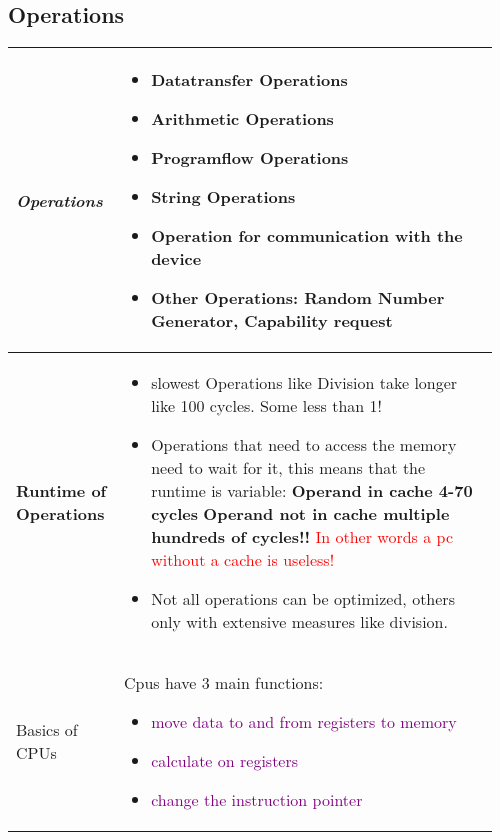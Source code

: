 \documentclass[main.tex,fontsize=8pt,paper=a4,paper=portrait,DIV=calc,]{scrartcl}
\begin{document}
\begin{table}[h!]
\subsection{Operations}
\begin{tabular}{|m{0.2\linewidth}|m{0.755\linewidth}|}
\hline
\emph{Operations} & 
\vspace{2mm}
\begin{itemize}
  \item \textbf{Datatransfer Operations}
  \item \textbf{Arithmetic Operations}
  \item \textbf{Programflow Operations}
  \item \textbf{String Operations}
  \item \textbf{Operation for communication with the device}
  \item \textbf{Other Operations: Random Number Generator, Capability request}
  \vspace{-3mm}
\end{itemize}\\
\hline
\textbf{Runtime of Operations} & 
\vspace{2mm}
\begin{itemize}
  \item slowest Operations like Division take longer like 100 cycles. Some less than 1!
  \item Operations that need to access the memory need to wait for it,\newline
  this means that the runtime is variable: \newline
  \textbf{Operand in cache 4-70 cycles}\newline
  \textbf{Operand not in cache multiple hundreds of cycles!!}\newline
  \textcolor{red}{In other words a pc without a cache is useless!}
\item Not all operations can be optimized, others only with extensive measures like division.
  \vspace{-3mm}
\end{itemize}\\
\hline
Basics of CPUs & 
Cpus have 3 main functions:\newline
\begin{itemize}
\item \textcolor{purple}{move data to and from registers to memory}
\item \textcolor{purple}{calculate on registers}
\item \textcolor{purple}{change the instruction pointer}

\end{itemize}
\end{tabular}
\end{table}
\end{document}
